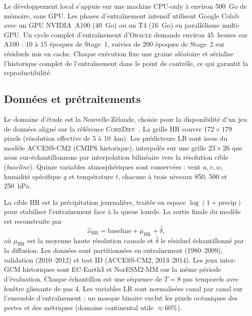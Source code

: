 \documentclass[14pt,a4paper,openany]{extreport}
\theoremstyle{definition}
\newcommand{\Oracle}{\textsc{Oracle}}
\newcommand{\CorrDiff}{\textsc{CorrDiff}}
\newcommand{\LR}{\ensuremath{\text{LR}}}
\newcommand{\HR}{\ensuremath{\text{HR}}}
\newcommand{\muHR}{\ensuremath{\mu_{\HR}}}
\begin{document}
Le développement local s'appuie sur une machine CPU-only à environ 500~Go de mémoire, sans GPU. Les phases d'entraînement intensif utilisent Google Colab avec un GPU NVIDIA~A100 (40~Go) ou un T4 (16~Go) en parallélisme multi-GPU. Un cycle complet d'entraînement d'\Oracle{} demande environ 45~heures sur A100 : 10 à 15 époques de Stage~1, suivies de 200 époques de Stage~2 sur résiduels mis en cache. Chaque exécution fixe une graine aléatoire et sérialise l'historique complet de l'entraînement dans le point de contrôle, ce qui garantit la reproductibilité.

\subsection{Données et prétraitements}
\label{ssec:exp-env-data}

Le domaine d'étude est la Nouvelle-Zélande, choisie pour la disponibilité d'un jeu de données aligné sur la référence \CorrDiff{}~\cite{mardani_corrdiff_2023}. La grille \HR{} couvre $172 \times 179$ pixels (résolution effective de 5 à 10~km). Les prédicteurs \LR{} sont issus du modèle ACCESS-CM2 (CMIP6 historique), interpolés sur une grille $23 \times 26$ que nous sur-échantillonnons par interpolation bilinéaire vers la résolution cible (\emph{baseline}). Quinze variables atmosphériques sont conservées : vent $u, v, w$, humidité spécifique $q$ et température $t$, chacune à trois niveaux 850, 500 et 250~hPa.

La cible \HR{} est la précipitation journalière, traitée en espace $\log(1 + \mathrm{precip})$ pour stabiliser l'entraînement face à la queue lourde. La sortie finale du modèle est reconstruite par
\begin{equation}
  \widehat{x}_{\HR} = \mathrm{baseline} + \muHR + \widehat{\delta},
  \label{eq:exp-decomp}
\end{equation}
où $\muHR$ est la moyenne haute résolution causale et $\widehat{\delta}$ le résiduel échantillonné par la diffusion. Les données sont partitionnées en entraînement (1980--2009), validation (2010--2012) et test ID (ACCESS-CM2, 2013--2014). Les jeux inter-GCM historiques sont EC-Earth3 et NorESM2-MM sur la même période d'évaluation. Chaque échantillon est une séquence de $T = 8$ pas temporels avec fenêtre glissante de pas 4. Les variables \LR{} sont normalisées canal par canal sur l'ensemble d'entraînement ; un masque binaire exclut les pixels océaniques des pertes et des métriques (domaine continental utile $\approx 60\%$).

\end{document}
